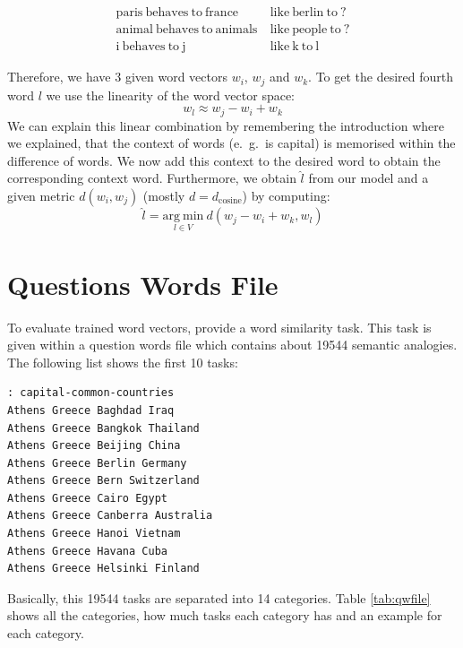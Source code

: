 \begin{align*}
\mathrm{paris\ behaves\ to\ france\ }&\mathrm{like\ berlin\ to\ ?} \\
\mathrm{animal\ behaves\ to\ animals\ }&\mathrm{like\ people\ to\ ?} \\
\mathrm{i\ behaves\ to\ j\ }&\mathrm{like\ k\ to\ l} 
\end{align*}

Therefore, we have $3$ given word vectors $w_i$, $w_j$ and $w_k$. To get the 
desired fourth word $l$ we use the linearity of the word vector space:
\[
w_l \approx w_j - w_i + w_k
\]
We can explain this linear combination by remembering the introduction where
we explained, that the context of words (e.~g.~is capital) is memorised within
the difference of words. We now add this context to the desired word to obtain
the corresponding context word. Furthermore, we obtain $\widehat{l}$ from our 
model and a given metric $d(w_i, w_j)$ (mostly $d = d_\mathrm{cosine}$) by
computing:
\[
\widehat{l} = \underset{l \in V}{\mathrm{arg~min}}\ d(w_j - w_i + w_k, w_l)
\]


\section{Questions Words File}

To evaluate trained word vectors, \cite{mikolov2013efficient} provide a word
similarity task. This task is given within a question words file which
contains about 19544 semantic analogies. The following list shows the first
10 tasks:

\begin{Shaded}
\begin{verbatim}
: capital-common-countries
Athens Greece Baghdad Iraq
Athens Greece Bangkok Thailand
Athens Greece Beijing China
Athens Greece Berlin Germany
Athens Greece Bern Switzerland
Athens Greece Cairo Egypt
Athens Greece Canberra Australia
Athens Greece Hanoi Vietnam
Athens Greece Havana Cuba
Athens Greece Helsinki Finland
\end{verbatim}
\end{Shaded}

Basically, this 19544 tasks are separated into 14 categories. Table \ref{tab:qwfile}
shows all the categories, how much tasks each category has and an example for each
category.

